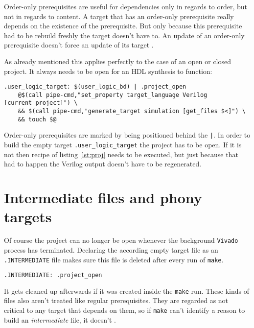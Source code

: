 Order-only prerequisites are useful for dependencies only in regards to order, but not in regards to content. A target that has an order-only prerequisite really depends on the existence of the prerequisite. But only because this prerequisite had to be rebuild freshly the target doesn't have to. An update of an order-only prerequisite doesn't force an update of its target \cite[see][p. 22]{Make16}.

As already mentioned this applies perfectly to the case of an open or closed project. It always needs to be open for an HDL synthesis to function:

\begin{lstlisting}[language={[gnu] make}, caption={\texttt{Makefile} that generates Verilog output of user logic block design}, captionpos=b]
.user_logic_target: $(user_logic_bd) | .project_open
	@$(call pipe-cmd,"set_property target_language Verilog [current_project]") \
	&& $(call pipe-cmd,"generate_target simulation [get_files $<]") \
	&& touch $@
\end{lstlisting}
\noindent
Order-only prerequisites are marked by being positioned behind the \texttt{|}. In order to build the empty target \texttt{.user\_logic\_target} the project has to be open. If it is not then recipe of listing \ref{lst:proj} needs to be executed, but just because that had to happen the Verilog output doesn't have to be regenerated.



\section{Intermediate files and phony targets}

Of course the project can no longer be open whenever the background \texttt{Vivado} process has terminated. Declaring the according empty target file as an \texttt{.INTERMEDIATE} file makes sure this file is deleted after every run of \texttt{make}.
\begin{lstlisting}[language={[gnu] make}]
.INTERMEDIATE: .project_open
\end{lstlisting}
\noindent
It gets cleaned up afterwards if it was created inside the \texttt{make} run. These kinds of files also aren't treated like regular prerequisites. They are regarded as not critical to any target that depends on them, so if \texttt{make} can't identify a reason to build an \textit{intermediate} file, it doesn't \cite[see][p. 118]{Make16}.


